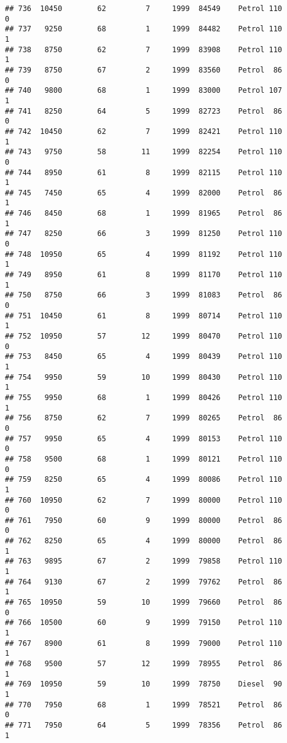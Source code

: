 \documentclass[]{article}
\begin{document}
\begin{verbatim}
## 736  10450        62         7     1999  84549    Petrol 110         0
## 737   9250        68         1     1999  84482    Petrol 110         1
## 738   8750        62         7     1999  83908    Petrol 110         1
## 739   8750        67         2     1999  83560    Petrol  86         0
## 740   9800        68         1     1999  83000    Petrol 107         1
## 741   8250        64         5     1999  82723    Petrol  86         0
## 742  10450        62         7     1999  82421    Petrol 110         1
## 743   9750        58        11     1999  82254    Petrol 110         0
## 744   8950        61         8     1999  82115    Petrol 110         1
## 745   7450        65         4     1999  82000    Petrol  86         1
## 746   8450        68         1     1999  81965    Petrol  86         1
## 747   8250        66         3     1999  81250    Petrol 110         0
## 748  10950        65         4     1999  81192    Petrol 110         1
## 749   8950        61         8     1999  81170    Petrol 110         1
## 750   8750        66         3     1999  81083    Petrol  86         0
## 751  10450        61         8     1999  80714    Petrol 110         1
## 752  10950        57        12     1999  80470    Petrol 110         0
## 753   8450        65         4     1999  80439    Petrol 110         1
## 754   9950        59        10     1999  80430    Petrol 110         1
## 755   9950        68         1     1999  80426    Petrol 110         1
## 756   8750        62         7     1999  80265    Petrol  86         0
## 757   9950        65         4     1999  80153    Petrol 110         0
## 758   9500        68         1     1999  80121    Petrol 110         0
## 759   8250        65         4     1999  80086    Petrol 110         1
## 760  10950        62         7     1999  80000    Petrol 110         0
## 761   7950        60         9     1999  80000    Petrol  86         0
## 762   8250        65         4     1999  80000    Petrol  86         1
## 763   9895        67         2     1999  79858    Petrol 110         1
## 764   9130        67         2     1999  79762    Petrol  86         1
## 765  10950        59        10     1999  79660    Petrol  86         0
## 766  10500        60         9     1999  79150    Petrol 110         1
## 767   8900        61         8     1999  79000    Petrol 110         1
## 768   9500        57        12     1999  78955    Petrol  86         1
## 769  10950        59        10     1999  78750    Diesel  90         1
## 770   7950        68         1     1999  78521    Petrol  86         0
## 771   7950        64         5     1999  78356    Petrol  86         1

\end{verbatim}
\end{document}
